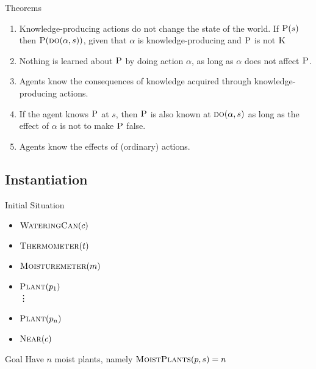 \begin{frame}{Theorems}
    \begin{enumerate}
        \item Knowledge-producing actions do not change the state of the world. If $\textsc{P}(s)$ then $\textsc{P}(\textsc{do}(\alpha, s))$, given that $\alpha$ is knowledge-producing and $\textsc{P}$ is not $\textsc{K}$
        \item Nothing is learned about $\textsc{P}$ by doing action $\alpha$, as long as $\alpha$ does not affect $\textsc{P}$.
        \item Agents know the consequences of knowledge acquired through knowledge-producing actions.
        \item If the agent knows $\textsc{P}$ at $s$, then $\textsc{P}$ is also known at $\textsc{do} (\alpha,s)$ as long as the effect of $\alpha$ is not to make $\textsc{P}$ false.
        \item Agents know the effects of (ordinary) actions.
    \end{enumerate}
\end{frame}

\subsection{Instantiation}

\begin{frame}[fragile]{Initial Situation}
    \begin{itemize}
        \item $\textsc{WateringCan}(c)$
        \item $\textsc{Thermometer}(t)$
        \item $\textsc{Moisturemeter}(m)$
        \item $\textsc{Plant}(p_1)$ \\
        \hspace{0.5cm}\vdots
        \item $\textsc{Plant}(p_n)$
        \item $\textsc{Near}(c)$
    \end{itemize}
    \begin{block}{Goal}
        Have $n$ moist plants, namely $\textsc{MoistPlants}(p,s) = n$
    \end{block}
\end{frame}

